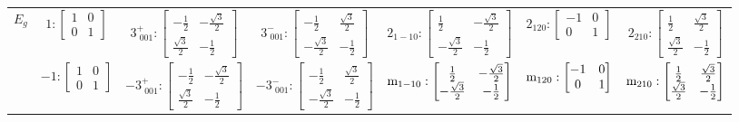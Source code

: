 \documentclass[fleqn,8pt,landscape]{jsarticle}
\begin{document}
\begin{longtable}{ccccccc}
$ E_{g} $ & $ 1:\begin{bmatrix} 1 & 0 \\ 0 & 1 \end{bmatrix} $ & $ 3^{+}_{\,\,001}:\begin{bmatrix} - \frac{1}{2} & - \frac{\sqrt{3}}{2} \\ \frac{\sqrt{3}}{2} & - \frac{1}{2} \end{bmatrix} $ & $ 3^{-}_{\,\,001}:\begin{bmatrix} - \frac{1}{2} & \frac{\sqrt{3}}{2} \\ - \frac{\sqrt{3}}{2} & - \frac{1}{2} \end{bmatrix} $ & $ 2{}_{1-10}:\begin{bmatrix} \frac{1}{2} & - \frac{\sqrt{3}}{2} \\ - \frac{\sqrt{3}}{2} & - \frac{1}{2} \end{bmatrix} $ & $ 2{}_{120}:\begin{bmatrix} -1 & 0 \\ 0 & 1 \end{bmatrix} $ & $ 2{}_{210}:\begin{bmatrix} \frac{1}{2} & \frac{\sqrt{3}}{2} \\ \frac{\sqrt{3}}{2} & - \frac{1}{2} \end{bmatrix} $ \\
& $ -1:\begin{bmatrix} 1 & 0 \\ 0 & 1 \end{bmatrix} $ & $ -3^{+}_{\,\,001}:\begin{bmatrix} - \frac{1}{2} & - \frac{\sqrt{3}}{2} \\ \frac{\sqrt{3}}{2} & - \frac{1}{2} \end{bmatrix} $ & $ -3^{-}_{\,\,001}:\begin{bmatrix} - \frac{1}{2} & \frac{\sqrt{3}}{2} \\ - \frac{\sqrt{3}}{2} & - \frac{1}{2} \end{bmatrix} $ & $ {\rm m}_{1-10}:\begin{bmatrix} \frac{1}{2} & - \frac{\sqrt{3}}{2} \\ - \frac{\sqrt{3}}{2} & - \frac{1}{2} \end{bmatrix} $ & $ {\rm m}_{120}:\begin{bmatrix} -1 & 0 \\ 0 & 1 \end{bmatrix} $ & $ {\rm m}_{210}:\begin{bmatrix} \frac{1}{2} & \frac{\sqrt{3}}{2} \\ \frac{\sqrt{3}}{2} & - \frac{1}{2} \end{bmatrix} $ \\ \hline

\end{longtable}
\end{document}
